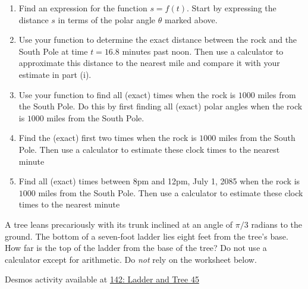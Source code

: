 \documentclass{ximera}
\begin{document}
\begin{question}
\begin{enumerate}
\item Find an expression for the function $s=f(t)$. Start by expressing the distance $s$ in terms of the polar angle $\theta$ marked above.

\item Use your function to determine the exact distance between the rock and the South Pole at time $t=16.8$ minutes past noon. Then use a calculator to approximate this distance to the nearest mile and compare it with your estimate in part (i).

\item Use  your function to find all (exact) times when the rock is $1000$ miles from the South Pole. Do this by first finding all (exact) polar angles when the rock is $1000$ miles from the South Pole.

\item Find the (exact) first two times when the rock is $1000$ miles from the South Pole. Then use a calculator to estimate these clock times to the nearest minute

\item Find all (exact) times between 8pm and 12pm, July 1, 2085 when the rock is $1000$ miles from the South Pole. Then use a calculator to estimate these clock times to the nearest minute

\end{enumerate}
\end{question}

\begin{question} \label{QLMVVEVEeddf}
A tree leans precariously with its trunk inclined at an angle of $\pi/3$ radians to the ground. The bottom of a seven-foot ladder lies eight feet from the tree's base. How far is the top of the ladder from the base of the tree? Do not use a calculator except for arithmetic. Do \emph{not} rely on the worksheet below.

\begin{onlineOnly}
    \begin{center}
\end{center}
\end{onlineOnly}

Desmos activity available at \href{https://www.desmos.com/calculator/sjmjseyqyp}{142: Ladder and Tree 45}


\end{question}
\end{document}

